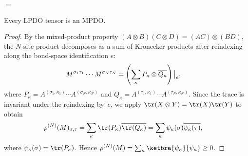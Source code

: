 \begin{definition}[LPDO]
\begin{tenkzequation}
        \begin{tenkz}[rows={wire}, cols=1, west=open, east=open]
        \end{tenkz}
        $ = $
        \begin{tenkz}[rows={op,op}, cols=3]
             
             
        \end{tenkz}
    \end{tenkzequation}
\end{definition}

\begin{lemma}\label{thm:lpdo_is_mpdo}
    \leanok
    Every LPDO tensor is an MPDO.
\end{lemma}

\begin{proof}
    \leanok
    By the mixed-product property
    $(A\otimes B)(C\otimes D)=(AC)\otimes(BD)$, the $N$-site product
    decomposes as a sum of Kronecker products after reindexing along the
    bond-space identification $e$:
    \begin{align}
        M^{\sigma_1\tau_1}\cdots M^{\sigma_N\tau_N}
         & =
        \left(\sum_{\kappa}
        P_\kappa\otimes\overline{Q_\kappa}\right)\big|_e,
        \notag
    \end{align}
    where
    $P_\kappa
        =A^{(\sigma_1,\kappa_1)}\cdots A^{(\sigma_N,\kappa_N)}$
    and
    $Q_\kappa
        =A^{(\tau_1,\kappa_1)}\cdots A^{(\tau_N,\kappa_N)}$.
    Since the trace is invariant under the reindexing by~$e$, we apply
    $\tr(X\otimes Y)=\tr(X)\tr(Y)$ to obtain
    \begin{align}
        \rho^{(N)}(M)_{\sigma,\tau}
         & =
        \sum_\kappa
        \tr(P_\kappa)\overline{\tr(Q_\kappa)}
        =
        \sum_\kappa
        \psi_\kappa(\sigma)\overline{\psi_\kappa(\tau)},
        \notag
    \end{align}
    where $\psi_\kappa(\sigma)=\tr(P_\kappa)$.
    Hence
    $\rho^{(N)}(M)
        =\sum_\kappa\ketbra{\psi_\kappa}{\psi_\kappa}\ge0$.
\end{proof}
